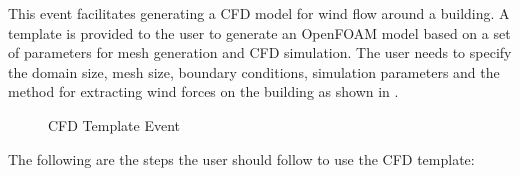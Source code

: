This event facilitates generating a CFD model for wind flow around a building. A template is provided to the user to generate an OpenFOAM model based on a set of parameters for mesh generation and CFD simulation. The user needs to specify the domain size, mesh size, boundary conditions, simulation parameters and the method for extracting wind forces on the building as shown in .

\begin{figure}[!htbp]
    \caption{CFD Template Event}
    \label{fig:cfd_template}
\end{figure}

The following are the steps the user should follow to use the CFD template:

